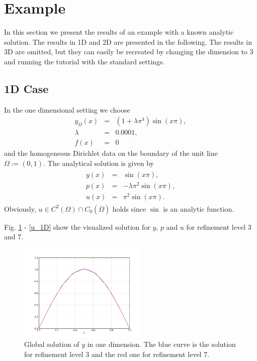 \documentclass[a4paper, 11pt, twoside]{article}
\begin{document}
\section{Example}\label{sectionExample}
In this section we present the results of an example with a known analytic solution. The results in 1D and 2D are presented in the following. The results in 3D are omitted, but they can easily be recreated by changing the dimension to 3 and running the tutorial with the standard settings.


\subsection{1D Case}\label{sectiononedimension}

In the one dimensional setting we choose 
\begin{eqnarray}
y_{\Omega}(x) &=& (1 + \lambda \pi^4) \sin (x \pi), \\
\lambda &=& 0.0001,	\\
f(x) &=& 0
\end{eqnarray}
and the homogeneous Dirichlet data on the boundary of the unit line $\Omega:=(0,1)$. The analytical solution is given by 
\begin{eqnarray}\label{analyticalsolution}
\begin{array}{rcl}
y(x) &=& \sin (x\pi), \\
p(x) &=& -\lambda \pi^2 \sin (x\pi), \\
u(x) &=& \pi^2 \sin (x\pi).
\end{array}
\end{eqnarray}
Obviously, $u \in C^2(\Omega) \cap C_0(\overline{\Omega})$ holds since $\sin$ is an analytic function.

Fig. \ref{y_1D} - \ref{u_1D} show the visualized solution for $y$, $p$ and $u$ for refinement level 3 and 7.
\begin{figure}[h!]
	\centering
		\includegraphics[width=0.55\textwidth]{fig/y_distributed_control_poison_tut_1d_lvl_3_7.png}

\caption{Global solution of $y$ in one dimension. The blue curve is the solution for refinement level 3 and the red one for refinement level 7.}
\label{y_1D}
\end{figure}
\end{document}
